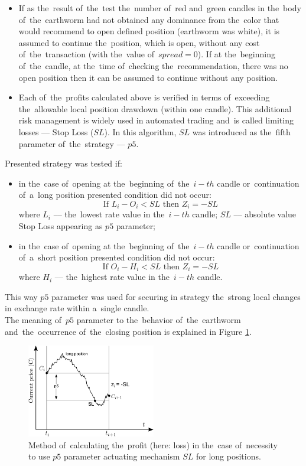 \documentclass[runningheads,a4paper]{llncs}
\begin{document}
\begin{itemize}
\item If as the~result of~the~test the~number of~red and~green candles in the~body of~the~earthworm had not obtained any dominance from the~color that would recommend to open defined position (earthworm was white), it is assumed to continue the~position, which is open, without any cost of~the~transaction (with the~value of~$spread = 0$). If at the~beginning of~the~candle, at the~time of~checking the~recommendation, there was no open position then it can be assumed to continue without any position.
\item Each of~the~profits calculated above is verified in terms of~exceeding the~allowable local position drawdown (within one candle). This additional risk management is widely used in automated trading and~is called limiting losses --- Stop Loss ($SL$). In this algorithm, $SL$ was introduced as the~fifth parameter of~the~strategy --- $p5$.
\end{itemize}

\noindent Presented strategy was tested if:
\begin{itemize}
\item in the~case of~opening at the~beginning of~the~$i-th$ candle or~continuation of~a~long position presented condition did not occur:\\
\begin{equation}
\text{If } L_i-O_i<SL \text{ then } Z_i=-SL
\end{equation}
where $L_i$ --– the~lowest rate value in the~$i-th$ candle; $SL$ --– absolute value Stop Loss appearing as $p5$ parameter;
\item in the~case of~opening at the~beginning of~the~$i-th$ candle or~continuation of~a~short position presented condition did not occur:
\begin{equation}
\text{If } O_i-H_i<SL \text{ then } Z_i=-SL
\end{equation}
where $H_i$ --– the~highest rate value in the~$i-th$ candle.
\end{itemize}
This way $p5$ parameter was used for securing in strategy the~strong local changes in exchange rate within a~single candle.\\
The meaning of~$p5$ parameter to the~behavior of~the~earthworm and~the~occurrence of~the~closing position is explained in Figure \ref{fig:fig5}.
\begin{figure}[h!]
\centering
\includegraphics[width = 0.5\textwidth]{figures/rys5.png}
\caption{Method of~calculating the~profit (here: loss) in the~case of~necessity to use $p5$ parameter actuating mechanism $SL$ for long positions.}
\label{fig:fig5}
\end{figure}
\FloatBarrier
\end{document}
